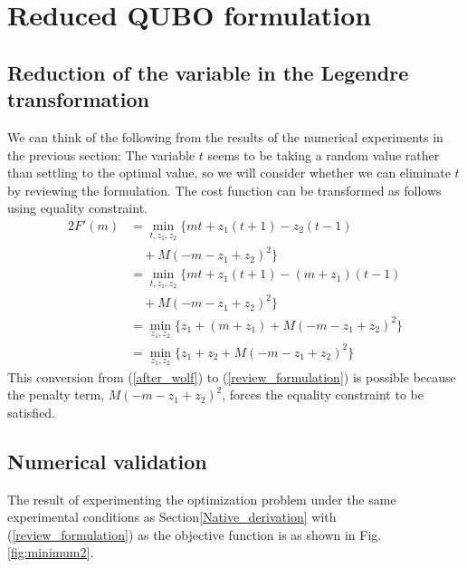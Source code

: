 \documentclass[fp,twocolumn]{jpsj3}
\begin{document}
\section{Reduced QUBO formulation} %
\subsection{Reduction of the variable in the Legendre transformation}
We can think of the following from the results of the numerical experiments in the previous section: The variable $t$ seems to be taking a random value rather than settling to the optimal value, so we will consider whether we can eliminate $t$ by reviewing the formulation. 
The cost function can be transformed as follows using equality constraint.
\begin{alignat}{2}
  F'(m)&=\min_{t,z_{1},z_{2}}{\{mt+z_{1}(t+1)-z_{2}(t-1)} \nonumber \\
  &\quad+M(-m-z_{1}+z_{2})^{2}\} \nonumber \\
  &=\min_{t,z_{1},z_{2}}{\{mt+z_{1}(t+1)-(m+z_{1})(t-1)} \nonumber \\
  &\quad+M(-m-z_{1}+z_{2})^{2}\} \nonumber \\
  &=\min_{z_{1},z_{2}}{\{z_{1}+(m+z_{1})+M(-m-z_{1}+z_{2})^{2}\}} \nonumber \\
  &=\min_{z_{1},z_{2}}{\{z_{1}+z_{2}+M(-m-z_{1}+z_{2})^{2}\}} \label{review_formulation}
\end{alignat}
This conversion from (\ref{after_wolf}) to (\ref{review_formulation}) is possible because the penalty term, $M(-m-z_{1}+z_{2})^{2}$, forces the equality constraint to be satisfied.

\subsection{Numerical validation} %
The result of experimenting the optimization problem under the same experimental conditions as Section\ref{Native_derivation} with (\ref{review_formulation}) as the objective function is as shown in Fig.\ref{fig:minimum2}.
\end{document}
